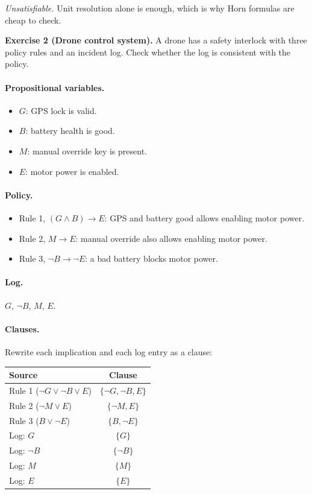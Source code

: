 \documentclass{article}
\theoremstyle{theorem}
\theoremstyle{definition}
\theoremstyle{remark}
\begin{document}
\emph{Unsatisfiable.} Unit resolution alone is enough, which is why Horn formulas are cheap to check.

\bigskip

\textbf{Exercise 2 (Drone control system).}
A drone has a safety interlock with three policy rules and an incident log. Check whether the log is consistent with the policy.

\paragraph{Propositional variables.}
\begin{itemize}
  \item $G$: GPS lock is valid.
  \item $B$: battery health is good.
  \item $M$: manual override key is present.
  \item $E$: motor power is enabled.
\end{itemize}

\paragraph{Policy.}
\begin{itemize}
  \item Rule 1, $(G \land B) \to E$: GPS and battery good allows enabling motor power.
  \item Rule 2, $M \to E$: manual override also allows enabling motor power.
  \item Rule 3, $\lnot B \to \lnot E$: a bad battery blocks motor power.
\end{itemize}

\paragraph{Log.} $G$, $\lnot B$, $M$, $E$.

\paragraph{Clauses.} Rewrite each implication and each log entry as a clause:

\begin{center}
\begin{tabular}{l|c}
Source & Clause \\ \hline
Rule 1 ($\lnot G \lor \lnot B \lor E$) & $\{\lnot G, \lnot B, E\}$ \\
Rule 2 ($\lnot M \lor E$) & $\{\lnot M, E\}$ \\
Rule 3 ($B \lor \lnot E$) & $\{B, \lnot E\}$ \\
Log: $G$ & $\{G\}$ \\
Log: $\lnot B$ & $\{\lnot B\}$ \\
Log: $M$ & $\{M\}$ \\
Log: $E$ & $\{E\}$ \\
\end{tabular}
\end{center}
\end{document}
